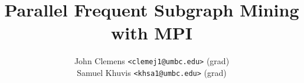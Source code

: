 \documentclass{article}
\title{Parallel Frequent Subgraph Mining with MPI}
\author{John Clemens \texttt{<clemej1@umbc.edu>} (grad)\\
	Samuel Khuvis \texttt{<khsa1@umbc.edu>} (grad)}
\begin{document}
\maketitle







{}

\end{document}
